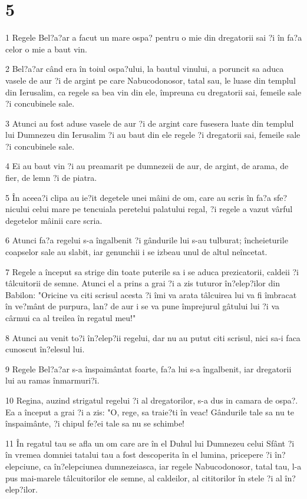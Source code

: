 \chapter{5}

\par 1 Regele Bel?a?ar a facut un mare ospa? pentru o mie din dregatorii sai ?i în fa?a celor o mie a baut vin.
\par 2 Bel?a?ar când era în toiul ospa?ului, la bautul vinului, a poruncit sa aduca vasele de aur ?i de argint pe care Nabucodonosor, tatal sau, le luase din templul din Ierusalim, ca regele sa bea vin din ele, împreuna cu dregatorii sai, femeile sale ?i concubinele sale.
\par 3 Atunci au fost aduse vasele de aur ?i de argint care fusesera luate din templul lui Dumnezeu din Ierusalim ?i au baut din ele regele ?i dregatorii sai, femeile sale ?i concubinele sale.
\par 4 Ei au baut vin ?i au preamarit pe dumnezeii de aur, de argint, de arama, de fier, de lemn ?i de piatra.
\par 5 În aceea?i clipa au ie?it degetele unei mâini de om, care au scris în fa?a sfe?nicului celui mare pe tencuiala peretelui palatului regal, ?i regele a vazut vârful degetelor mâinii care scria.
\par 6 Atunci fa?a regelui s-a îngalbenit ?i gândurile lui s-au tulburat; încheieturile coapselor sale au slabit, iar genunchii i se izbeau unul de altul neîncetat.
\par 7 Regele a început sa strige din toate puterile sa i se aduca prezicatorii, caldeii ?i tâlcuitorii de semne. Atunci el a prins a grai ?i a zis tuturor în?elep?ilor din Babilon: "Oricine va citi scrisul acesta ?i îmi va arata tâlcuirea lui va fi îmbracat în ve?mânt de purpura, lan? de aur i se va pune împrejurul gâtului lui ?i va cârmui ca al treilea în regatul meu!"
\par 8 Atunci au venit to?i în?elep?ii regelui, dar nu au putut citi scrisul, nici sa-i faca cunoscut în?elesul lui.
\par 9 Regele Bel?a?ar s-a înspaimântat foarte, fa?a lui s-a îngalbenit, iar dregatorii lui au ramas înmarmuri?i.
\par 10 Regina, auzind strigatul regelui ?i al dregatorilor, s-a dus in camara de ospa?. Ea a început a grai ?i a zis: "O, rege, sa traie?ti în veac! Gândurile tale sa nu te înspaimânte, ?i chipul fe?ei tale sa nu se schimbe!
\par 11 În regatul tau se afla un om care are în el Duhul lui Dumnezeu celui Sfânt ?i în vremea domniei tatalui tau a fost descoperita în el lumina, pricepere ?i în?elepciune, ca în?elepciunea dumnezeiasca, iar regele Nabucodonosor, tatal tau, l-a pus mai-marele tâlcuitorilor ele semne, al caldeilor, al cititorilor în stele ?i al în?elep?ilor.
